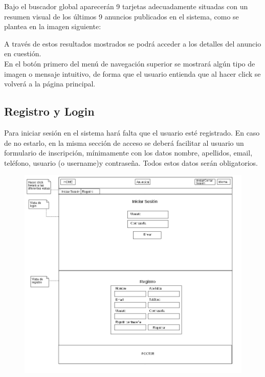 Bajo el buscador global aparecer\'{a}n 9 tarjetas adecuadamente situadas con un resumen visual de los \'{u}ltimos 9 anuncios publicados en el sistema, como se plantea en la imagen siguiente:



A trav\'{e}s de estos resultados mostrados se podr\'{a} acceder a los detalles del anuncio en cuesti\'{o}n.\\

En el bot\'{o}n primero del men\'{u} de navegaci\'{o}n superior se mostrar\'{a} alg\'{u}n tipo de imagen o mensaje intuitivo, de forma que el usuario entienda que al hacer click se volver\'{a} a la p\'{a}gina principal.

\subsection{Registro y Login}

Para iniciar sesi\'{o}n en el sistema har\'{a} falta que el usuario est\'{e} registrado. En caso de no estarlo, en la misma secci\'{o}n de acceso se deber\'{a} facilitar al usuario un formulario de inscripci\'{o}n, m\'{i}nimamente con los datos nombre, apellidos, email, tel\'{e}fono, usuario (o username)y contrase\~{n}a. Todos estos datos ser\'{a}n obligatorios. 


\begin{figure}[h!]
\centering
\includegraphics[width=.9\textwidth]{Img/VisionAplicacion/vision_2.jpg}
\end{figure}


